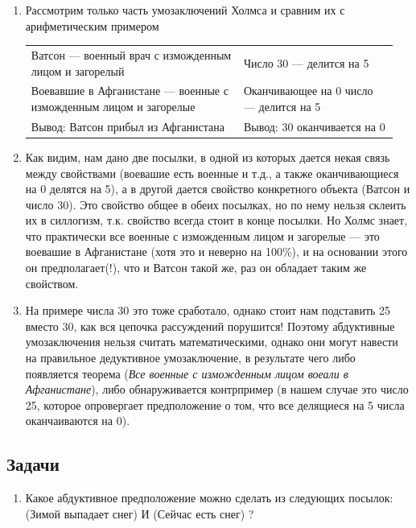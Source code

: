 \begin{enumerate}
\item Рассмотрим только часть умозаключений Холмса и сравним их с арифметическим примером\hfill\;

\begin{tabular}{p{0.55\linewidth}p{0.4\linewidth}}\hline
Ватсон --- военный врач с изможденным лицом и загорелый & 
Число 30 --- делится на 5 \\
Воевавшие в Афганистане --- военные с изможденным лицом и загорелые &
Оканчивающее на 0 число --- делится на 5 \\\hline

Вывод: Ватсон прибыл из Афганистана & Вывод: 30 оканчивается на 0\\\hline
\end{tabular}

\item Как видим, нам дано две посылки, в одной из которых дается некая связь между свойствами (воевашие есть военные и т.д., а также оканчивающиеся на 0 делятся на 5), а в другой дается свойство конкретного объекта (Ватсон и число 30). Это свойство общее в обеих посылках, но по нему нельзя склеить их в силлогизм, т.к. свойство всегда стоит в конце посылки. Но Холмс знает, что практически все военные с изможденным лицом и загорелые --- это воевашие в Афганистане (хотя это и неверно на 100\%), и на основании этого он предполагает(!), что и Ватсон такой же, раз он обладает таким же свойством.

\item На примере числа 30 это тоже сработало, однако стоит нам подставить 25 вместо 30, как вся цепочка рассуждений порушится! Поэтому абдуктивные умозаключения нельзя считать математическими, однако они могут навести на правильное дедуктивное умозаключение, в результате чего либо появляется теорема (\textit{Все военные с изможденным лицом воеали в Афганистане}), либо обнаруживается контрпример (в нашем случае это число 25, которое опровергает предположение о том, что все делящиеся на 5 числа оканчаиваются на 0).
\end{enumerate}

\subsection*{Задачи}
\begin{enumerate}
\item Какое абдуктивное предположение можно сделать из следующих посылок: (Зимой выпадает снег) И (Сейчас есть снег) ?
\end{enumerate}


